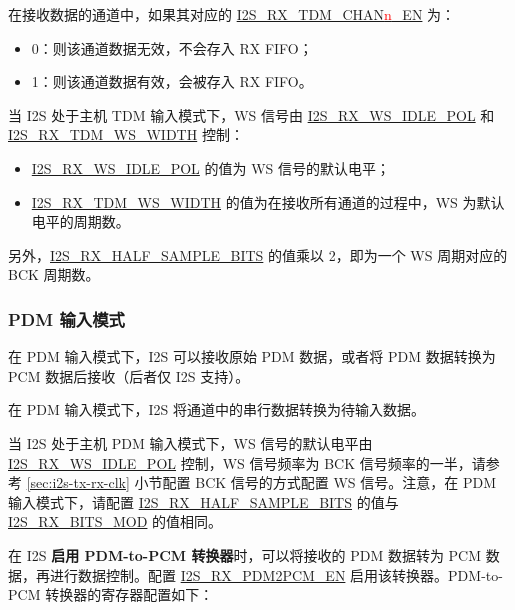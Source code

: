 \documentclass[main\_\_CN.tex]{subfiles}
\begin{document}
在接收数据的通道中，如果其对应的 \hyperref[fielddesc:I2STXTDMCHAN0EN]{I2S\_RX\_TDM\_CHAN{\textcolor{red}{n}}\_EN} 为：
\begin{itemize}
    \item 0：则该通道数据无效，不会存入 RX FIFO；
    \item 1：则该通道数据有效，会被存入 RX FIFO。
\end{itemize}
当 I2S 处于主机 TDM 输入模式下，WS 信号由 \hyperref[fielddesc:I2SRXWSIDLEPOL]{I2S\_RX\_WS\_IDLE\_POL} 和 \hyperref[fielddesc:I2SRXTDMWSWIDTH]{I2S\_RX\_TDM\_WS\_WIDTH} 控制：
\begin{itemize}
    \item \hyperref[fielddesc:I2SRXWSIDLEPOL]{I2S\_RX\_WS\_IDLE\_POL} 的值为 WS 信号的默认电平；
    \item \hyperref[fielddesc:I2SRXTDMWSWIDTH]{I2S\_RX\_TDM\_WS\_WIDTH} 的值为在接收所有通道的过程中，WS 为默认电平的周期数。
\end{itemize}
另外，\hyperref[fielddesc:I2SRXHALFSAMPLEBITS]{I2S\_RX\_HALF\_SAMPLE\_BITS} 的值乘以 2，即为一个 WS 周期对应的 BCK 周期数。

\subsubsection{PDM 输入模式} 

在 PDM 输入模式下，I2S 可以接收原始 PDM 数据，或者将 PDM 数据转换为 PCM 数据后接收（后者仅 I2S 支持）。

在 PDM 输入模式下，I2S 将通道中的串行数据转换为待输入数据。

当 I2S 处于主机 PDM 输入模式下，WS 信号的默认电平由 \hyperref[fielddesc:I2SRXWSIDLEPOL]{I2S\_RX\_WS\_IDLE\_POL} 控制，WS 信号频率为 BCK 信号频率的一半，请参考 \ref{sec:i2s-tx-rx-clk} 小节配置 BCK 信号的方式配置 WS 信号。注意，在 PDM 输入模式下，请配置 \hyperref[fielddesc:I2SRXHALFSAMPLEBITS]{I2S\_RX\_HALF\_SAMPLE\_BITS} 的值与 \hyperref[fielddesc:I2SRXBITSMOD]{I2S\_RX\_BITS\_MOD} 的值相同。

在 I2S \textbf{启用 PDM-to-PCM 转换器}时，可以将接收的 PDM 数据转为 PCM 数据，再进行数据控制。配置 \hyperref[fielddesc:I2SRXPDM2PCMEN]{I2S\_RX\_PDM2PCM\_EN} 启用该转换器。PDM-to-PCM 转换器的寄存器配置如下：
\end{document}
